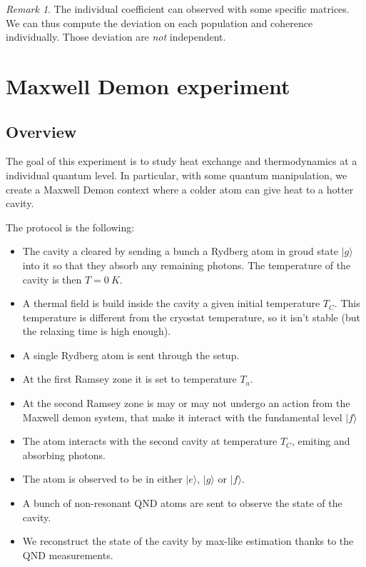 \documentclass[10pt,a4paper]{report}
\theoremstyle{plain}
\theoremstyle{definition}
\theoremstyle{remark}
\newtheorem*{rem}{Remark}
\newcommand{\TODO}{\textbf{TODO}}
\newcommand{\ket}[1]{|#1\rangle}
\begin{document}
\begin{rem} The individual coefficient can observed with some specific matrices.
  We
  can thus compute the deviation on each population and coherence individually.
  Those deviation are \emph{not} independent.
\end{rem}


\section{Maxwell Demon experiment}

\subsection{Overview}

The goal of this experiment is to study heat exchange and thermodynamics at a
individual quantum level. In particular, with some quantum manipulation, we
create a Maxwell Demon context where a colder atom can give heat to a hotter
cavity.

The protocol is the following:

\begin{itemize}
\item The cavity a cleared by sending a bunch a Rydberg atom in groud state
  $\ket g$ into it so that they absorb any remaining photons. The temperature of
  the cavity is then $T = \SI{0}{K}$.
\item A thermal field is build inside the cavity a given initial temperature
  $T_C$. This temperature is different from the cryostat temperature, so it
  isn't stable (but the relaxing time is high enough).
\item A single Rydberg atom is sent through the setup.
\item At the first Ramsey zone it is set to temperature $T_a$.
\item At the second Ramsey zone is may or may not undergo an action from the Maxwell
  demon system, that make it interact with the fundamental level $\ket f$
\item The atom interacts with the second cavity at temperature $T_C$, emiting
  and absorbing photons.
\item The atom is observed to be in either $\ket e$, $\ket g$ or $\ket f$.
\item A bunch of non-resonant QND atoms are sent to observe the state of the cavity.
\item We reconstruct the state of the cavity by max-like estimation thanks to
  the QND measurements.
\end{itemize}
\end{document}
